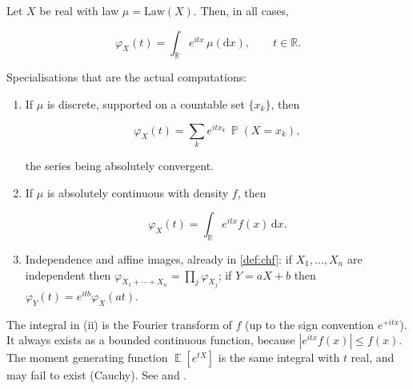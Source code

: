 \documentclass[11pt,a4paper]{article}
\DeclareMathOperator{\E}{\mathbb{E}}
\DeclareMathOperator{\Pbb}{\mathbb{P}}
\begin{document}
\begin{proposition}
\label{prop:chf-compute}
Let \(X\) be real with law \(\mu=\mathrm{Law}(X)\). Then, in all cases,

\[
\varphi_{X}(t)
=
\int_{\mathbb{R}} e^{itx}\,\mu(\mathrm{d}x),
\qquad
t\in\mathbb{R}.
\]

Specialisations that are the actual computations:

\begin{enumerate}[label=\textup{(\roman*)}]
    \item
    If \(\mu\) is discrete, supported on a countable set \(\{x_{k}\}\), then

\[
\varphi_{X}(t)
=
\sum_{k} e^{itx_{k}}\,\Pbb(X=x_{k}),
\]

the series being absolutely convergent.

    \item
    If \(\mu\) is absolutely continuous with density \(f\), then

\[
\varphi_{X}(t)
=
\int_{\mathbb{R}} e^{itx} f(x)\,\mathrm{d}x.
\]

    \item
    Independence and affine images, already in \cref{def:chf}: if \(X_{1},\dots,X_{n}\) are independent then \(\varphi_{X_{1}+\cdots+X_{n}}=\prod_{j}\varphi_{X_{j}}\); if \(Y=aX+b\) then \(\varphi_{Y}(t)=e^{itb}\varphi_{X}(at)\).
\end{enumerate}

The integral in (ii) is the Fourier transform of \(f\) (up to the sign convention \(e^{+itx}\)). It always exists as a bounded continuous function, because \(|e^{itx}f(x)|\le f(x)\). The moment generating function \(\E[e^{tX}]\) is the same integral with \(t\) real, and may fail to exist (Cauchy). See \citep[Theorems~3.3.1 and~3.3.2]{durrett2010} and \citep[Chapter~6]{chung1968}.
\end{proposition}
\end{document}
